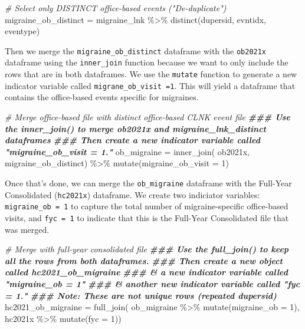 \documentclass[
]{book}
\newenvironment{Shaded}{\begin{snugshade}}{\end{snugshade}}
\newcommand{\AttributeTok}[1]{\textcolor[rgb]{0.77,0.63,0.00}{#1}}
\newcommand{\CommentTok}[1]{\textcolor[rgb]{0.56,0.35,0.01}{\textit{#1}}}
\newcommand{\DecValTok}[1]{\textcolor[rgb]{0.00,0.00,0.81}{#1}}
\newcommand{\DocumentationTok}[1]{\textcolor[rgb]{0.56,0.35,0.01}{\textbf{\textit{#1}}}}
\newcommand{\FunctionTok}[1]{\textcolor[rgb]{0.00,0.00,0.00}{#1}}
\newcommand{\NormalTok}[1]{#1}
\newcommand{\OtherTok}[1]{\textcolor[rgb]{0.56,0.35,0.01}{#1}}
\newcommand{\SpecialCharTok}[1]{\textcolor[rgb]{0.00,0.00,0.00}{#1}}
\begin{document}
\begin{Shaded}
\begin{Highlighting}[]
\CommentTok{\# Select only DISTINCT office{-}based events ("De{-}duplicate")}
\NormalTok{migraine\_ob\_distinct }\OtherTok{=}\NormalTok{ migraine\_lnk }\SpecialCharTok{\%\textgreater{}\%}
  \FunctionTok{distinct}\NormalTok{(dupersid, evntidx, eventype)}
\end{Highlighting}
\end{Shaded}

Then we merge the \texttt{migraine\_ob\_distinct} dataframe with the \texttt{ob2021x} dataframe using the \texttt{inner\_join} function because we want to only include the rows that are in both dataframes. We use the \texttt{mutate} function to generate a new indicator variable called \texttt{migrane\_ob\_visit\ =1}. This will yield a dataframe that contains the office-based events specific for migraines.

\begin{Shaded}
\begin{Highlighting}[]
\CommentTok{\# Merge office{-}based file with distinct office{-}based CLNK event file}
\DocumentationTok{\#\#\# Use the inner\_join() to merge ob2021x and migraine\_lnk\_distinct dataframes}
\DocumentationTok{\#\#\# Then create a new indicator variable called "migraine\_ob\_visit = 1."}
\NormalTok{ob\_migraine }\OtherTok{=} \FunctionTok{inner\_join}\NormalTok{(}
\NormalTok{  ob2021x, migraine\_ob\_distinct) }\SpecialCharTok{\%\textgreater{}\%}
  \FunctionTok{mutate}\NormalTok{(}\AttributeTok{migraine\_ob\_visit =} \DecValTok{1}\NormalTok{)}
\end{Highlighting}
\end{Shaded}

Once that's done, we can merge the \texttt{ob\_migraine} dataframe with the Full-Year Consolidated (\texttt{hc2021x}) dataframe. We create two indiciator variables: \texttt{migraine\_ob\ =\ 1} to capture the total number of migraine-specific office-based visits, and \texttt{fyc\ =\ 1} to indicate that this is the Full-Year Consolidated file that was merged.

\begin{Shaded}
\begin{Highlighting}[]
\CommentTok{\# Merge with full{-}year consolidated file}
\DocumentationTok{\#\#\# Use the full\_join() to keep all the rows from both dataframes.}
\DocumentationTok{\#\#\# Then create a new object called hc2021\_ob\_migraine}
\DocumentationTok{\#\#\# \& a new indicator variable called "migraine\_ob = 1"}
\DocumentationTok{\#\#\# \& another new indicator variable called "fyc = 1."}
\DocumentationTok{\#\#\# Note: These are not unique rows (repeated dupersid)}
\NormalTok{hc2021\_ob\_migraine }\OtherTok{=} \FunctionTok{full\_join}\NormalTok{(}
\NormalTok{  ob\_migraine }\SpecialCharTok{\%\textgreater{}\%} \FunctionTok{mutate}\NormalTok{(}\AttributeTok{migraine\_ob =} \DecValTok{1}\NormalTok{),}
\NormalTok{  hc2021x }\SpecialCharTok{\%\textgreater{}\%} \FunctionTok{mutate}\NormalTok{(}\AttributeTok{fyc =} \DecValTok{1}\NormalTok{))}
\end{Highlighting}
\end{Shaded}
\end{document}

